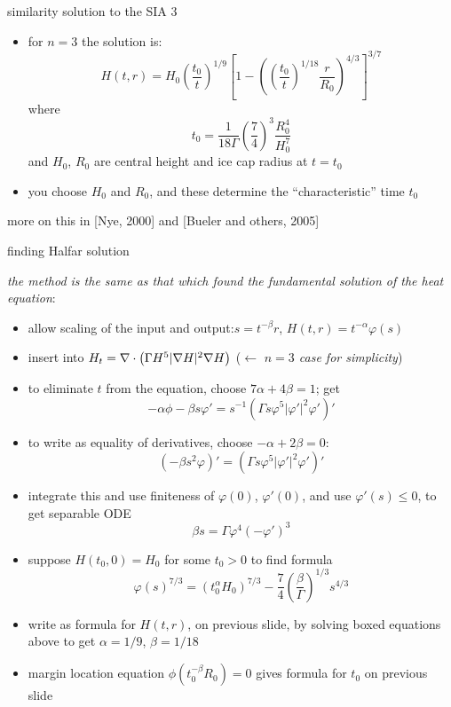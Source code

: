 \begin{frame}{similarity solution to the SIA 3}

\begin{itemize}
\item for $n=3$ the solution is:
  $$H(t,r) = H_0 \left(\frac{t_0}{t}\right)^{1/9} \left[1 - \left(\left(\frac{t_0}{t}\right)^{1/18} \frac{r}{R_0}\right)^{4/3}\right]^{3/7}$$
where
  $$t_0 = \frac{1}{18 \Gamma} \left(\frac{7}{4}\right)^3 \frac{R_0^4}{H_0^{7}}$$
and $H_0$, $R_0$ are central height and ice cap radius at $t=t_0$
\item you choose $H_0$ and $R_0$, and these determine the ``characteristic'' time $t_0$
\end{itemize}

\begin{center}
\tiny  more on this in [Nye, 2000]\nocite{Nye00} and [Bueler and others, 2005]\nocite{BLKCB}
\end{center}
\end{frame}


\begin{frame}{finding Halfar solution}

\small
\emph{the method is the same as that which found the fundamental solution of the heat equation}:
\begin{itemize}
\item allow scaling of the input and output:\qquad  $s = t^{-\beta} r$, \quad $H(t,r) = t^{-\alpha} \varphi(s)$
\item insert into $H_t = \nabla\cdot \left(\Gamma H^{5} |\nabla H|^{2} \nabla H \right)$ \qquad\qquad ($\leftarrow$ \emph{$n=3$ case for simplicity})
\item to eliminate $t$ from the equation, choose $\boxed{7\alpha + 4\beta = 1}$; get
	$$-\alpha \phi - \beta s \varphi' = s^{-1} \left(\Gamma s \varphi^5 |\varphi'|^2\varphi'\right)'$$
\item to write as equality of derivatives, choose $\boxed{-\alpha + 2\beta=0}$:
	$$\left(-\beta s^2 \varphi\right)' = \left(\Gamma s \varphi^5 |\varphi'|^2\varphi'\right)'$$
\item integrate this and use finiteness of $\varphi(0)$, $\varphi'(0)$, and use $\varphi'(s)\le 0$, to get separable ODE
	$$\beta s = \Gamma \varphi^4 (-\varphi')^3$$
\item suppose $H(t_0,0)=H_0$ for some $t_0>0$ to find formula
	$$\varphi(s)^{7/3} = (t_0^\alpha H_0)^{7/3} - \frac{7}{4} \left(\frac{\beta}{\Gamma}\right)^{1/3} s^{4/3}$$
\item write as formula for $H(t,r)$, on previous slide, by solving boxed equations above to get $\alpha=1/9$, $\beta = 1/18$
\item margin location equation $\phi(t_0^{-\beta} R_0)=0$ gives formula for $t_0$ on previous slide
\end{itemize}
\end{frame}


